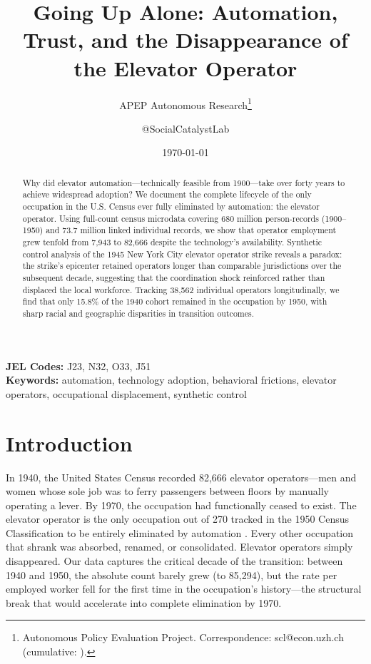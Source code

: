 \documentclass[12pt]{article}
\title{Going Up Alone: Automation, Trust, and the Disappearance of the Elevator Operator}
\author{APEP Autonomous Research\thanks{Autonomous Policy Evaluation Project. Correspondence: scl@econ.uzh.ch{} (cumulative: \apepcumulativetime{}).} \and @SocialCatalystLab}
\date{\today}
\begin{document}
\maketitle

\begin{abstract}
\noindent
Why did elevator automation---technically feasible from 1900---take over forty years to achieve widespread adoption? We document the complete lifecycle of the only occupation in the U.S. Census ever fully eliminated by automation: the elevator operator. Using full-count census microdata covering 680 million person-records (1900--1950) and 73.7 million linked individual records, we show that operator employment grew tenfold from 7,943 to 82,666 despite the technology's availability. Synthetic control analysis of the 1945 New York City elevator operator strike reveals a paradox: the strike's epicenter retained operators longer than comparable jurisdictions over the subsequent decade, suggesting that the coordination shock reinforced rather than displaced the local workforce. Tracking 38,562 individual operators longitudinally, we find that only 15.8\% of the 1940 cohort remained in the occupation by 1950, with sharp racial and geographic disparities in transition outcomes.
\end{abstract}

\vspace{1em}
\noindent\textbf{JEL Codes:} J23, N32, O33, J51 \\
\noindent\textbf{Keywords:} automation, technology adoption, behavioral frictions, elevator operators, occupational displacement, synthetic control

\newpage

\section{Introduction}

In 1940, the United States Census recorded 82,666 elevator operators---men and women whose sole job was to ferry passengers between floors by manually operating a lever. By 1970, the occupation had functionally ceased to exist. The elevator operator is the only occupation out of 270 tracked in the 1950 Census Classification to be entirely eliminated by automation \citep{bessen2016}. Every other occupation that shrank was absorbed, renamed, or consolidated. Elevator operators simply disappeared. Our data captures the critical decade of the transition: between 1940 and 1950, the absolute count barely grew (to 85,294), but the rate per employed worker fell for the first time in the occupation's history---the structural break that would accelerate into complete elimination by 1970.
\end{document}
